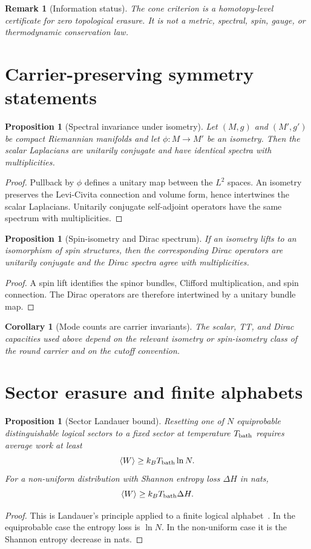 \documentclass[11pt,a4paper]{article}
\newtheorem{proposition}[theorem]{Proposition}
\newtheorem{corollary}[theorem]{Corollary}
\newtheorem{remark}[theorem]{Remark}
\begin{document}
\begin{remark}[Information status]
The cone criterion is a homotopy-level certificate for zero topological erasure.  It is not a metric, spectral, spin, gauge, or thermodynamic conservation law.
\end{remark}

\section{Carrier-preserving symmetry statements}

\begin{proposition}[Spectral invariance under isometry]
Let $(M,g)$ and $(M',g')$ be compact Riemannian manifolds and let $\phi:M\to M'$ be an isometry.  Then the scalar Laplacians are unitarily conjugate and have identical spectra with multiplicities.
\end{proposition}
\begin{proof}
Pullback by $\phi$ defines a unitary map between the $L^2$ spaces.  An isometry preserves the Levi-Civita connection and volume form, hence intertwines the scalar Laplacians.  Unitarily conjugate self-adjoint operators have the same spectrum with multiplicities.
\end{proof}

\begin{proposition}[Spin-isometry and Dirac spectrum]
If an isometry lifts to an isomorphism of spin structures, then the corresponding Dirac operators are unitarily conjugate and the Dirac spectra agree with multiplicities.
\end{proposition}
\begin{proof}
A spin lift identifies the spinor bundles, Clifford multiplication, and spin connection.  The Dirac operators are therefore intertwined by a unitary bundle map.
\end{proof}

\begin{corollary}[Mode counts are carrier invariants]
The scalar, TT, and Dirac capacities used above depend on the relevant isometry or spin-isometry class of the round carrier and on the cutoff convention.
\end{corollary}

\section{Sector erasure and finite alphabets}

\begin{proposition}[Sector Landauer bound]
Resetting one of $N$ equiprobable distinguishable logical sectors to a fixed sector at temperature $T_{\rm bath}$ requires average work at least
\[
\langle W\rangle\ge k_BT_{\rm bath}\ln N.
\]
For a non-uniform distribution with Shannon entropy loss $\Delta H$ in nats,
\[
\langle W\rangle\ge k_BT_{\rm bath}\Delta H.
\]
\end{proposition}
\begin{proof}
This is Landauer's principle applied to a finite logical alphabet~\cite{Landauer1961}.  In the equiprobable case the entropy loss is $\ln N$.  In the non-uniform case it is the Shannon entropy decrease in nats.
\end{proof}
\end{document}
